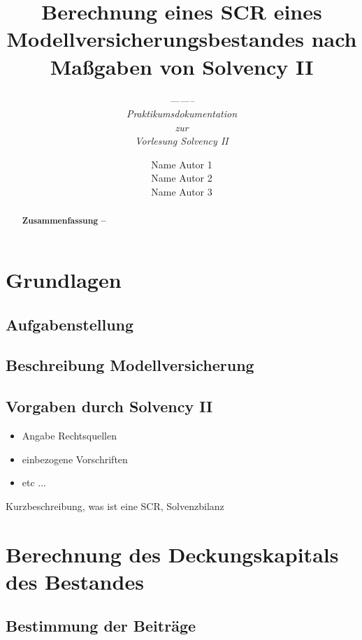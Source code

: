\documentclass[parskip,12pt,paper=a4]{scrartcl}
\date{}
\begin{document}
\titlehead{Fachbereich Mathematik\\Johann Wolfgang Goethe Universität}
\title{Berechnung eines SCR eines Modellversicherungsbestandes nach Maßgaben von Solvency II}
\subtitle{\textit{--------\\Praktikumsdokumentation\\zur\\ Vorlesung Solvency II}}
\author{Name Autor 1\\
		Name Autor 2\\
		Name Autor 3}

\maketitle


\begin{abstract}
\noindent \textbf{Zusammenfassung  --  \,}  \blindtext
\end{abstract}
\clearpage
\tableofcontents
\clearpage

\section{Grundlagen}
\subsection{Aufgabenstellung}
\subsection{Beschreibung Modellversicherung}
\subsection{Vorgaben durch Solvency II}
\begin{itemize}
	\item Angabe Rechtsquellen
	\item einbezogene Vorschriften
	\item etc ...
\end{itemize}

Kurzbeschreibung, was ist eine SCR, Solvenzbilanz

\section{Berechnung des Deckungskapitals des Bestandes}

\subsection{Bestimmung der Beiträge}
\end{document}
